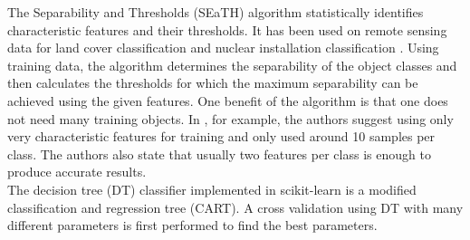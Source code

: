 \documentclass[authoryear, review,12pt,number]{elsarticle}
\begin{document}
The Separability and Thresholds (SEaTH) algorithm
\citep{Nussbaum2006} statistically identifies characteristic features and their
thresholds. It has been used on remote sensing data for land cover
classification \citep{Gao2011} and nuclear installation classification
\citep{Nussbaum2006}. Using training data, the algorithm determines the
separability of the object classes and then calculates the thresholds for which
the maximum separability can be achieved using the given features. One benefit
of the algorithm is that one does not need many training objects.
In  \cite{Nussbaum2006}, for example, the authors
suggest using only very characteristic features for training and only used
around 10 samples per class. The authors also state that
usually two features per class is enough to produce accurate results.\\

The decision tree (DT) classifier implemented in scikit-learn is a modified
classification and regression tree (CART)\citep{scikit-learn}. A cross
validation using DT with many different parameters is first performed to find
the best parameters. 

\end{document}
